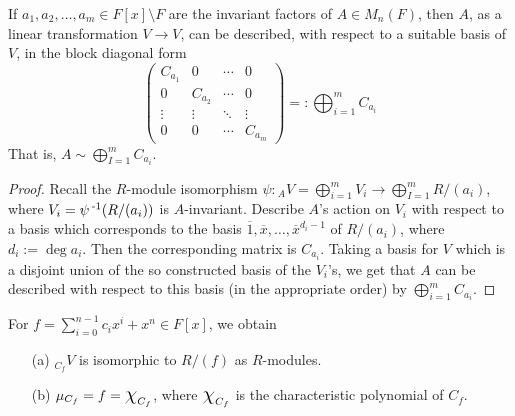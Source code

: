 \documentclass[11pt]{book}
\theoremstyle{definition}   \newtheorem{defn}[counter]{Definition} %
\newcommand{\ov}{\overline}   \newcommand{\wt}{\widetilde}
\newcommand{\bs}{\setminus}   \newcommand{\A}{\mathcal{A}}   \newcommand{\sy}{\textnormal{Syl}}   \newcommand{\size}[1]{\left| #1 \right|}
\newcommand{\mymatrix}[2]{\left( \begin{array}{#1} #2 \end{array} \right)}
\newcommand{\Chi}{\mbox{\Large $\chi$}}
\DeclareMathOperator{\ra}{\rightarrow}   \DeclareMathOperator{\Poly}{\mathbf{P}}   \DeclareMathOperator{\spn}{\textnormal{span}}   \DeclareMathOperator{\aut}{\textnormal{Aut}}
\newcommand{\vs}{\vspace{8pt}}
\numberwithin{counter}{chapter}
\begin{document}
\vs

\begin{corollary}
If $a_1,a_2,\dots,a_m \in F[x]\bs F$ are the invariant factors of $A \in M_n(F)$, then $A$, as a linear transformation $V \ra V$, can be described, with respect to a suitable basis of $V$, in the block diagonal form
	\[\mymatrix{cccc}{C_{a_1} & 0 & \cdots & 0 \\
	                  0 & C_{a_2} & \cdots & 0 \\
	                  \vdots & \vdots & \ddots & \vdots \\
	                  0 & 0 & \cdots & C_{a_m}} =: \bigoplus_{i=1}^m C_{a_i} \]
That is, $A \sim \bigoplus_{I=1}^m C_{a_i}$.
\end{corollary}

\begin{proof}
Recall the $R$-module isomorphism $\psi : {_AV} = \bigoplus_{i=1}^m V_i \ra \bigoplus_{I=1}^m R/(a_i)$, where $V_i = \psi\operatorname{^{-1}}(R/(a_i))$ is $A$-invariant. Describe $A$'s action on $V_i$ with respect to a basis which corresponds to the basis $\ov{1},\ov{x},\dots,\ov{x}^{d_{i} - 1}$ of $R/(a_i)$, where $d_i := \deg a_i$. Then the corresponding matrix is $C_{a_i}$. Taking a basis for $V$ which is a disjoint union of the so constructed basis of the $V_i$'s, we get that $A$ can be described with respect to this basis (in the appropriate order) by $\bigoplus_{i=1}^m C_{a_i}$.
\end{proof}

\vs

\begin{lemma}
For $f = \sum_{i=0}^{n-1} c_i x^i + x^n \in F[x]$, we obtain
\begin{enumerate}
\item[(a)] $_{C_f}V$ is isomorphic to $R/(f)$ as $R$-modules.
\item[(b)] $\mu_{C_f} = f = \Chi_{C_f}$, where $\Chi_{C_f}$ is the characteristic polynomial of $C_f$.
\end{enumerate}
\end{lemma}
\end{document}
